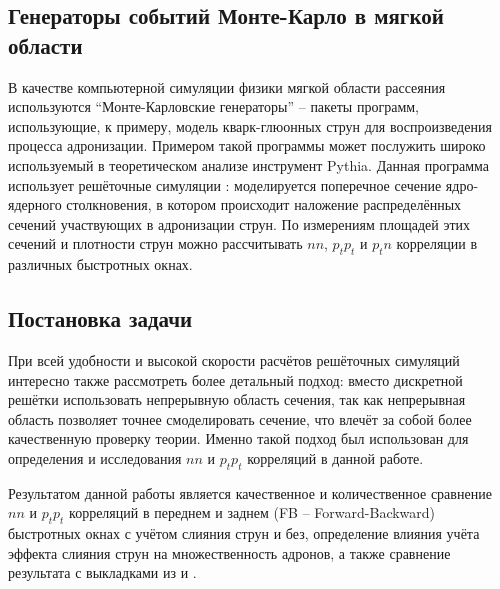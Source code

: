 \subsection{Генераторы событий Монте-Карло в мягкой области}
В качестве компьютерной симуляции физики мягкой области рассеяния используются ``Монте-Карловские генераторы'' \cite{MonteCarlo1,MonteCarlo2} -- пакеты программ, использующие, к примеру, модель кварк-глюонных струн для воспроизведения процесса адронизации. 
Примером такой программы может послужить широко используемый в теоретическом анализе инструмент Pythia. 
Данная программа использует решёточные симуляции \cite{TransLattice1,TransLattice2}: моделируется поперечное сечение ядро-ядерного столкновения, в котором происходит наложение распределённых сечений участвующих в адронизации струн. 
По измерениям площадей этих сечений и плотности струн можно рассчитывать $nn$, $p_t p_t$ и $p_t n$ корреляции в различных быстротных окнах.
\subsection{Постановка задачи}
При всей удобности и высокой скорости расчётов решёточных симуляций интересно также рассмотреть более детальный подход: вместо дискретной решётки использовать непрерывную область сечения, так как непрерывная область позволяет точнее смоделировать сечение, что влечёт за собой более качественную проверку теории. 
Именно такой подход был использован для определения и исследования $nn$ и $p_tp_t$ корреляций в данной работе. 

Результатом данной работы является качественное и количественное сравнение $nn$ и $p_tp_t$ корреляций в переднем и заднем (FB -- Forward-Backward) быстротных окнах с учётом слияния струн и без, определение влияния учёта эффекта слияния струн на множественность адронов, а также сравнение результата с выкладками из \cite{bStatement} и \cite{dissert}.
